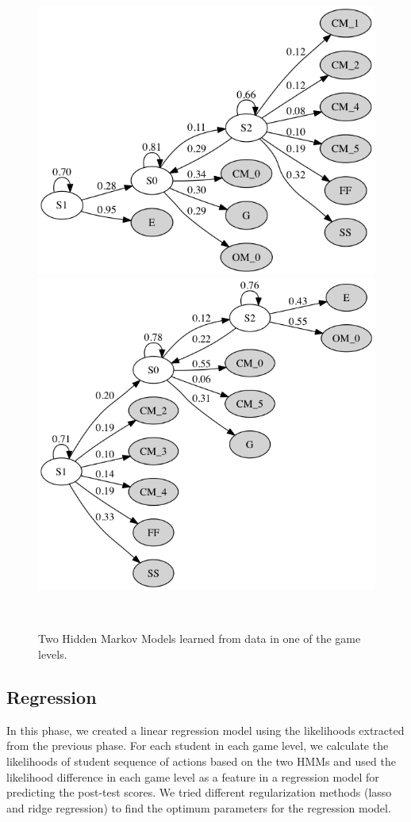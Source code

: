 \documentclass{sigchi}
\begin{document}
\begin{figure}
	\centering
	\includegraphics[width=0.9\columnwidth]{figures/high}
	\includegraphics[width=0.9\columnwidth]{figures/low}
		\caption{Two Hidden Markov Models learned from data in one of the game levels. }~\label{fig:highvslow}
\end{figure}


\subsection{Regression}

In this phase, we created a linear regression model using the likelihoods extracted from the previous phase. 
For each student in each game level, we calculate the likelihoods of student sequence of actions based on the two HMMs and used the likelihood difference in each game level as a feature in a regression model for predicting the post-test scores.
We tried different regularization methods (lasso and ridge regression) to find the optimum parameters for the regression model. 
\end{document}
